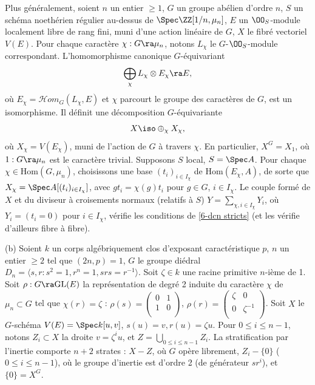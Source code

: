 \documentclass[10pt]{../fichiers-configuration-latex/smfart}
\begin{document}
Plus généralement, soient $n$ un entier $\ge 1$, $G$ un groupe abélien d'ordre $n$, $S$ un schéma
noethérien régulier au-dessus de $\Spec \ZZ[1/n,\mu_n]$, $E$ un $\OO_{S}$-module localement
libre de rang fini, muni d'une action linéaire de $G$, $X$ le fibré vectoriel $V(E)$. Pour chaque
caractère $\chi : G \ra \mu_n$, notons $L_{\chi}$ le $G$-$\OO_S$-module correspondant.
L'homomorphisme canonique $G$-équivariant $$ \bigoplus_{\chi} L_{\chi} \otimes E_{\chi} \ra E, $$ où
$E_{\chi} = \mathscr{H}om_G(L_{\chi},E)$ et $\chi$ parcourt le groupe des caractères de $G$, est un
isomorphisme. Il définit une décomposition $G$-équivariante $$ X \iso \oplus_{\chi} X_{\chi}, $$ où
$X_{\chi} = V(E_{\chi})$, muni de l'action de $G$ à travers $\chi$. En particulier, $X^G = X_1$, où
$1 : G \ra \mu_n$ est le caractère trivial. Supposons $S$ local, $S = \Spec A$. Pour chaque $\chi \in
\mathrm{Hom}(G,\mu_n)$, choisissons une base $(t_i)_{i \in I_{\chi}}$ de $\mathrm{Hom}(E_{\chi},A)$,
de sorte que $X_{\chi} = \Spec A[(t_i)_{i \in I_{\chi}}]$, avec $gt_i = \chi(g)t_i$ pour $g \in G$, $i
\in I_{\chi}$. Le couple formé de $X$ et du diviseur à croisements normaux (relatifs à $S$) $Y =
\sum_{\chi, i \in I_{\chi}}Y_i$, où $Y_i = (t_i = 0)$ pour $i \in I_{\chi}$, vérifie les conditions
de \ref{6-dcn stricts} (et les vérifie d'ailleurs fibre à fibre).  

(b) Soient $k$ un corps algébriquement clos d'exposant caractéristique $p$, $n$ un entier $\ge 2$
tel que $(2n,p) = 1$, $G$ le groupe diédral $D_n = ⟨s,r : s^2 = 1, r^n = 1, srs = r^{-1}⟩$. Soit
$\zeta \in k$ une racine primitive $n$-ième de 1. Soit $\rho : G \ra \mathrm{GL}(E)$  la
représentation de degré 2 induite du caractère $\chi$ de $\mu_n \subset G$ tel que $\chi(r) = \zeta$
: $\rho(s) = \begin{pmatrix} 0 & 1 \\ 1 & 0 \\  \end{pmatrix} $, $\rho(r) = \begin{pmatrix} \zeta &
0 \\ 0 & \zeta^{-1} \\ \end{pmatrix}$. Soit $X$ le $G$-schéma $V(E) = \Spec k[u,v]$, $s(u) = v, r(u) =
\zeta u$. Pour $0 \le i \le n-1$, notons $Z_i \subset X$ la droite $v = \zeta^iu$, et $Z = \bigcup_{0
\le i \le n-1}Z_i$. La stratification par l'inertie comporte $n+2$ strates : $X-Z$, où $G$ opère
librement, $Z_i - \{0\}$ ($0 \le i \le n-1$), où le groupe d'inertie est d'ordre 2 (de générateur
$sr^i$), et $\{0\} = X^G$. 
\end{document}
